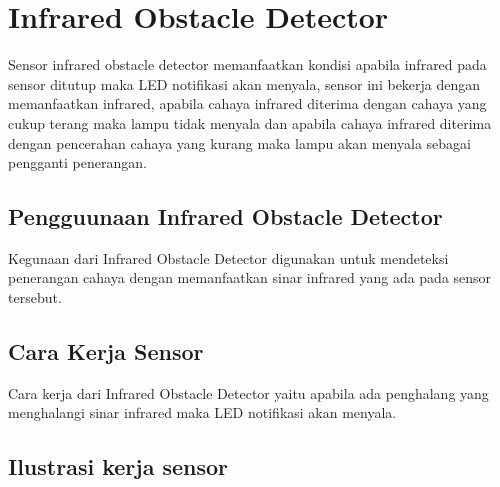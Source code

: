

\section{Infrared Obstacle Detector}
	Sensor infrared obstacle detector memanfaatkan kondisi apabila infrared pada sensor ditutup maka LED notifikasi akan menyala,
sensor ini bekerja dengan memanfaatkan infrared, apabila cahaya infrared diterima dengan cahaya yang cukup terang maka lampu tidak menyala dan apabila 
cahaya infrared diterima dengan pencerahan cahaya yang kurang maka lampu akan menyala sebagai pengganti penerangan.

\subsection{Pengguunaan Infrared Obstacle Detector}
	Kegunaan dari Infrared Obstacle Detector digunakan untuk mendeteksi penerangan cahaya dengan memanfaatkan sinar infrared yang ada pada sensor tersebut.
 
\subsection{Cara Kerja Sensor}
	Cara kerja dari Infrared Obstacle Detector yaitu apabila ada penghalang yang menghalangi sinar infrared maka LED notifikasi akan menyala.

\subsection{Ilustrasi kerja sensor}

